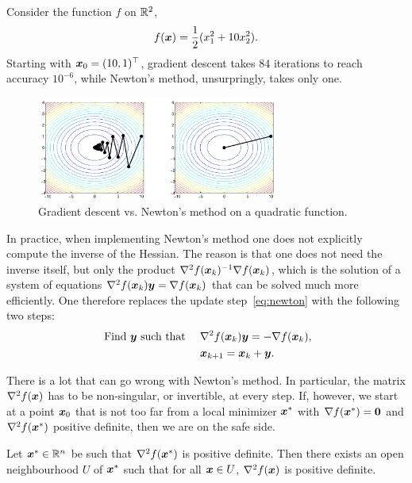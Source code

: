 \begin{example}
 Consider the function $f$ on $\mathbb{R}^2$, 
 \begin{equation*}
  f(\bm{x}) = \frac{1}{2}(x_1^2+10x_2^2).
 \end{equation*}
Starting with $\bm{x}_0=(10,1)^{\top}$, gradient descent takes $84$ iterations to reach accuracy $10^{-6}$, while Newton's method, unsurpringly, takes only one. 
\begin{figure}[h!]
 \centering
 \includegraphics[width=0.7\textwidth]{images/quadnewton_cropped.pdf}
 \caption{Gradient descent vs. Newton's method on a quadratic function.}
\end{figure}
\end{example}


In practice, when implementing Newton's method one does not explicitly compute the inverse of the Hessian. The reason is that one does not need the inverse itself, but only the product $\nabla^2f(\bm{x}_k)^{-1}\nabla f(\bm{x}_k)$, which is the solution of a system of equations $\nabla^2 f(\bm{x}_k)\bm{y} = \nabla f(\bm{x}_k)$ that can be solved much more efficiently. One therefore replaces the update step~\eqref{eq:newton} with the following two steps:
\begin{align*}
 \text{ Find } \bm{y} \text{ such that   }\quad  &\nabla^2f(\bm{x}_k)\bm{y}=-\nabla f(\bm{x}_k),\\
                &\bm{x}_{k+1} = \bm{x}_k+\bm{y}.
\end{align*}

There is a lot that can go wrong with Newton's method. In particular, the matrix $\nabla^2f(\bm{x})$ has to be non-singular, or invertible, at every step. If, however, we start at a point $\bm{x}_0$ that is not too far from a local minimizer $\bm{x}^*$ with $\nabla f(\bm{x}^*)=\bm{0}$ and $\nabla^2f(\bm{x}^*)$ positive definite, then we are on the safe side.

\begin{lemma}\label{le:continuity}
 Let $\bm{x}^*\in \mathbb{R}^n$ be such that $\nabla^2f(\bm{x}^*)$ is positive definite. Then there exists an open neighbourhood $U$ of $\bm{x}^*$ such that for all $\bm{x}\in U$, $\nabla^2 f(\bm{x})$ is positive definite.
\end{lemma}

